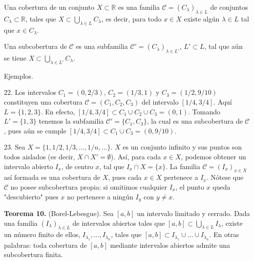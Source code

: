 \documentclass[12pt,oneside]{book}
\begin{document}
Una cobertura de un conjunto \(X \subset \mathbb{R}\) es una familia \(\mathcal{C} = (C_\lambda)_{\lambda \in L}\) de conjuntos \(C_\lambda \subset \mathbb{R}\), tales que \(X \subset \bigcup_{\lambda \in L} C_\lambda\), es decir, para todo \(x \in X\) existe algún \(\lambda \in L\) tal que \(x \in C_\lambda\).

Una subcobertura de \(\mathcal{C}\) es una subfamilia \(\mathcal{C}' = (C_\lambda)_{\lambda \in L'}\), \(L' \subset L\), tal que aún se tiene \(X \subset \bigcup_{\lambda \in L'} C_\lambda\).

Ejemplos.

22. Los intervalos \(C_1 = (0, 2/3)\), \(C_2 = (1/3, 1)\) y \(C_3 = (1/2, 9/10)\) constituyen una cobertura \(\mathcal{C} = (C_1, C_2, C_3)\) del intervalo \([1/4, 3/4]\). Aquí \(L = \{1, 2, 3\}\). En efecto, \([1/4, 3/4] \subset C_1 \cup C_2 \cup C_3 = (0, 1)\). Tomando \(L' = \{1, 3\}\) tenemos la subfamilia \(\mathcal{C}' = \{C_1, C_3\}\), la cual es una subcobertura de \(\mathcal{C}\), pues aún se cumple \([1/4, 3/4] \subset C_1 \cup C_3 = (0, 9/10)\).

23. Sea \(X = \{1, 1/2, 1/3, \dots, 1/n, \dots\}\). \(X\) es un conjunto infinito y sus puntos son todos aislados (es decir, \(X \cap X' = \emptyset\)). Así, para cada \(x \in X\), podemos obtener un intervalo abierto \(I_x\), de centro \(x\), tal que \(I_x \cap X = \{x\}\). La familia \(\mathcal{C} = (I_x)_{x \in X}\) así formada es una cobertura de \(X\), pues cada \(x \in X\) pertenece a \(I_x\). Nótese que \(\mathcal{C}\) no posee subcobertura propia: si omitimos cualquier \(I_x\), el punto \(x\) queda "descubierto" pues \(x\) no pertenece a ningún \(I_y\) con \(y \neq x\).

\textbf{Teorema 10.} (Borel-Lebesgue). Sea \([a, b]\) un intervalo limitado y cerrado. Dada una familia \((I_\lambda)_{\lambda \in L}\) de intervalos abiertos tales que \([a, b] \subset \bigcup_{\lambda \in L} I_\lambda\), existe un número finito de ellos, \(I_{\lambda_1}, \dots, I_{\lambda_n}\), tales que \([a, b] \subset I_{\lambda_1} \cup \dots \cup I_{\lambda_n}\). En otras palabras: toda cobertura de \([a, b]\) mediante intervalos abiertos admite una subcobertura finita.
\end{document}
